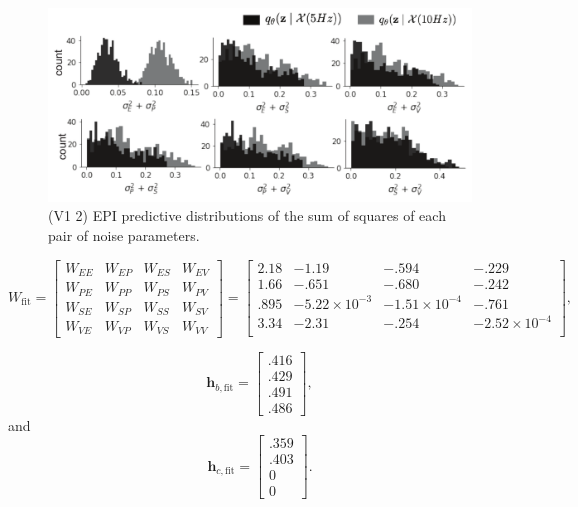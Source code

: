\documentclass[11pt]{article}
\begin{document}
\begin{figure}
\caption{\small (V1 2)
EPI predictive distributions of the sum of squares of each pair of noise parameters.
 }
 \label{fig:V1_2}
\begin{center}
\includegraphics[scale=.8]{figures/figV1_2/figV1_2.pdf}
\end{center}
\end{figure}

\begin{equation}
W_{\text{fit}} =  \begin{bmatrix} W_{EE} & W_{EP} & W_{ES} & W_{EV} \\
W_{PE} & W_{PP} & W_{PS} & W_{PV} \\
W_{SE} & W_{SP} & W_{SS} & W_{SV} \\
W_{VE} & W_{VP} & W_{VS} & W_{VV}  \end{bmatrix} = 
 \begin{bmatrix} 2.18 & -1.19 & -.594 & -.229 \\
 1.66 & -.651 & -.680 & -.242 \\
 .895 & -5.22 \times 10^{-3} & -1.51 \times 10^{-4}   & -.761 \\
 3.34 &  -2.31 & -.254  & -2.52 \times 10^{-4} \\
 \end{bmatrix},
\end{equation} 

\begin{equation}
\mathbf{h}_{b,\text{fit}} =
 \begin{bmatrix} .416 \\ .429 \\ .491 \\ .486 \end{bmatrix} ,
\end{equation} 
and
\begin{equation} 
\mathbf{h}_{c,\text{fit}} = 
\begin{bmatrix} .359 \\ .403 \\ 0 \\ 0 \end{bmatrix}.
\end{equation} 
\end{document}
